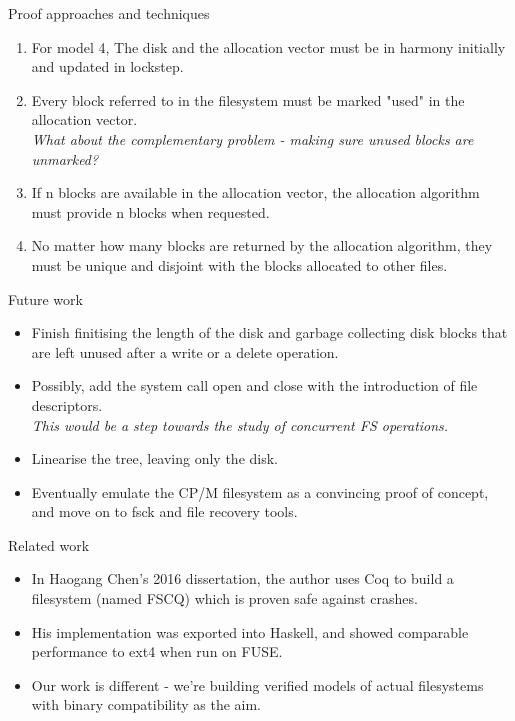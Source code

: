 \documentclass{beamer}
\begin{document}
\begin{frame}{Proof approaches and techniques}
  \begin{enumerate}
  \item For model 4, The disk and the allocation vector must be in harmony
    initially and updated in lockstep.
  \item Every block referred to in the filesystem must be marked
    "used" in the allocation vector.\\
    \textit{What about the complementary problem - making sure unused
      blocks are unmarked?}
  \item If n blocks are available in the allocation vector, the
    allocation algorithm must provide n blocks when requested.
  \item No matter how many blocks are returned by the allocation
    algorithm, they must be unique and disjoint with the blocks
    allocated to other files.
  \end{enumerate}
\end{frame}

\begin{frame}{Future work}
  \begin{itemize}
  \item Finish finitising the length of the disk and garbage
    collecting disk blocks that are left unused after a write or a delete
    operation.
  \item Possibly, add the system call open and close with the
    introduction of file descriptors.\\
    \textit{This would be a step towards the study of concurrent FS operations.}
  \item Linearise the tree, leaving only the disk.
  \item Eventually emulate the CP/M filesystem as a convincing proof
    of concept, and move on to fsck and file recovery tools.
  \end{itemize}
\end{frame}

\begin{frame}{Related work}
  \begin{itemize}
  \item In Haogang Chen's 2016 dissertation, the author uses Coq to
    build a filesystem (named FSCQ) which is proven safe against
    crashes.
  \item His implementation was exported into Haskell, and showed
    comparable performance to ext4 when run on FUSE.
  \item Our work is different - we're building verified models of
    actual filesystems with binary compatibility as the aim.
  \end{itemize}
\end{frame}
\end{document}
